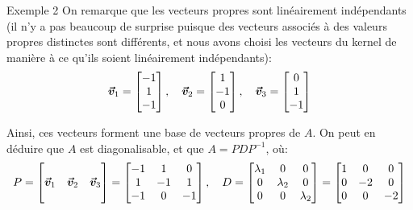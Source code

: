 \documentclass[a4paper]{article}
\begin{document}
\begin{parag}{Exemple 2}
    On remarque que les vecteurs propres sont linéairement indépendants (il n'y a pas beaucoup de surprise puisque des vecteurs associés à des valeurs propres distinctes sont différents, et nous avons choisi les vecteurs du kernel de manière à ce qu'ils soient linéairement indépendants):
    \[\bm{\protect\vec{v}}_1 = \begin{bmatrix} -1 \\ 1 \\ -1 \end{bmatrix}, \quad \bm{\protect\vec{v}}_2 = \begin{bmatrix} 1 \\ -1 \\ 0 \end{bmatrix}, \quad \bm{\protect\vec{v}}_3 = \begin{bmatrix} 0 \\ 1 \\ -1 \end{bmatrix} \]
    
    Ainsi, ces vecteurs forment une base de vecteurs propres de $A$.  On peut en déduire que $A$ est diagonalisable, et que $A = PDP^{-1}$, où: 
    \[P = \begin{bmatrix}  &  &  \\ \bm{\protect\vec{v}}_1 & \bm{\protect\vec{v}}_2 & \bm{\protect\vec{v}}_3 \\  &  &  \end{bmatrix} = \begin{bmatrix} -1 & 1 & 0 \\ 1 & -1 & 1 \\ -1 & 0 & -1 \end{bmatrix}, \quad D = \begin{bmatrix} \lambda_1 & 0 & 0 \\ 0 & \lambda_2 & 0 \\ 0 & 0 & \lambda_2 \end{bmatrix} = \begin{bmatrix} 1 & 0 & 0 \\ 0 & -2 & 0 \\ 0 & 0 & -2 \end{bmatrix} \]
    
\end{parag}
\end{document}
